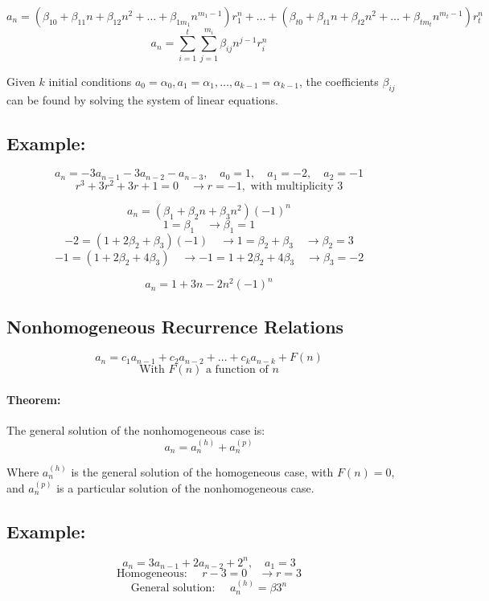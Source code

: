 \documentclass[11pt]{article}
\begin{document}
\[
a_n = (\beta_{10} + \beta_{11} n + \beta_{12} n^2 + \dots + \beta_{1m_1} n^{m_1-1}) r_1^n + \dots + (\beta_{t0} + \beta_{t1} n + \beta_{t2} n^2 + \dots + \beta_{tm_t} n^{m_t-1}) r_t^n
\]
\[
a_n = \sum_{i=1}^{t} \sum_{j=1}^{m_i} \beta_{ij} n^{j-1} r_i^n
\]

Given $k$ initial conditions $a_0 = \alpha_0, a_1 = \alpha_1, \dots, a_{k-1} = \alpha_{k-1}$, the coefficients $\beta_{ij}$ can be found by solving the system of linear equations.

\subsection*{Example:}
\[
a_n = -3 a_{n-1} - 3 a_{n-2} - a_{n-3}, \quad a_0 = 1, \quad a_1 = -2, \quad a_2 = -1
\]
\[
r^3 + 3r^2 + 3r + 1 = 0 \quad \rightarrow r = -1, \text{ with multiplicity } 3
\]

\[
a_n = (\beta_1 + \beta_2 n + \beta_3 n^2) (-1)^n
\]
\[
1 = \beta_1 \quad \rightarrow \beta_1 = 1
\]
\[
-2 = (1 + 2 \beta_2 + \beta_3) (-1) \quad \rightarrow 1 = \beta_2 + \beta_3 \quad \rightarrow \beta_2 = 3
\]
\[
-1 = (1 + 2 \beta_2 + 4 \beta_3) \quad \rightarrow -1 = 1 + 2 \beta_2 + 4 \beta_3 \quad \rightarrow \beta_3 = -2
\]

\[
a_n = 1 + 3n - 2n^2 (-1)^n
\]

\subsection{Nonhomogeneous Recurrence Relations}
\[
a_n = c_1 a_{n-1} + c_2 a_{n-2} + \dots + c_k a_{n-k} + F(n)
\]
\[
\text{With } F(n) \text{ a function of } n
\]

\paragraph{Theorem:}
The general solution of the nonhomogeneous case is:
\[
a_n = a_n^{(h)} + a_n^{(p)}
\]

Where $a_n^{(h)}$ is the general solution of the homogeneous case, with $F(n) = 0$, and $a_n^{(p)}$ is a particular solution of the nonhomogeneous case.

\subsection*{Example:}
\[
a_n = 3 a_{n-1} + 2 a_{n-2} + 2^n, \quad a_1 = 3
\]
\[
\text{Homogeneous: } \quad r - 3 = 0 \quad \rightarrow r = 3
\]
\[
\text{General solution: } \quad a_n^{(h)} = \beta 3^n
\]
\end{document}
